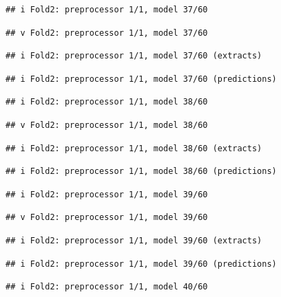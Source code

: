 \documentclass[
]{article}
\begin{document}
\begin{verbatim}
## i Fold2: preprocessor 1/1, model 37/60
\end{verbatim}

\begin{verbatim}
## v Fold2: preprocessor 1/1, model 37/60
\end{verbatim}

\begin{verbatim}
## i Fold2: preprocessor 1/1, model 37/60 (extracts)
\end{verbatim}

\begin{verbatim}
## i Fold2: preprocessor 1/1, model 37/60 (predictions)
\end{verbatim}

\begin{verbatim}
## i Fold2: preprocessor 1/1, model 38/60
\end{verbatim}

\begin{verbatim}
## v Fold2: preprocessor 1/1, model 38/60
\end{verbatim}

\begin{verbatim}
## i Fold2: preprocessor 1/1, model 38/60 (extracts)
\end{verbatim}

\begin{verbatim}
## i Fold2: preprocessor 1/1, model 38/60 (predictions)
\end{verbatim}

\begin{verbatim}
## i Fold2: preprocessor 1/1, model 39/60
\end{verbatim}

\begin{verbatim}
## v Fold2: preprocessor 1/1, model 39/60
\end{verbatim}

\begin{verbatim}
## i Fold2: preprocessor 1/1, model 39/60 (extracts)
\end{verbatim}

\begin{verbatim}
## i Fold2: preprocessor 1/1, model 39/60 (predictions)
\end{verbatim}

\begin{verbatim}
## i Fold2: preprocessor 1/1, model 40/60
\end{verbatim}
\end{document}
